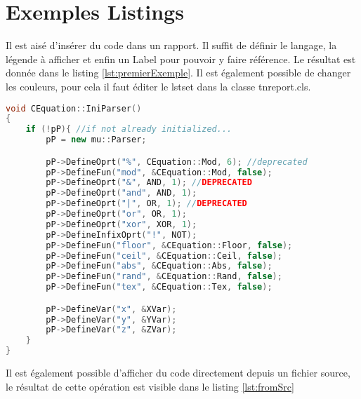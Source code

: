 \documentclass{tnreport}
\begin{document}
\cleardoublepage

\chapter{Exemples Listings}

Il est aisé d'insérer du code dans un rapport. Il suffit de définir le langage, la légende à afficher et enfin un Label pour pouvoir y faire référence. Le résultat est donnée dans le listing \ref{lst:premierExemple}. Il est également possible de changer les couleurs, pour cela il faut éditer le lstset dans la classe tnreport.cls.

\begin{lstlisting}[language=c++, caption={Premier Exemple}, label={lst:premierExemple}]
void CEquation::IniParser()
{
	if (!pP){ //if not already initialized...
		pP = new mu::Parser;

		pP->DefineOprt("%", CEquation::Mod, 6); //deprecated
		pP->DefineFun("mod", &CEquation::Mod, false);
		pP->DefineOprt("&", AND, 1); //DEPRECATED
		pP->DefineOprt("and", AND, 1);
		pP->DefineOprt("|", OR, 1); //DEPRECATED
		pP->DefineOprt("or", OR, 1);
		pP->DefineOprt("xor", XOR, 1);
		pP->DefineInfixOprt("!", NOT);
		pP->DefineFun("floor", &CEquation::Floor, false);
		pP->DefineFun("ceil", &CEquation::Ceil, false);
		pP->DefineFun("abs", &CEquation::Abs, false);
		pP->DefineFun("rand", &CEquation::Rand, false);
		pP->DefineFun("tex", &CEquation::Tex, false);

		pP->DefineVar("x", &XVar);
		pP->DefineVar("y", &YVar);
		pP->DefineVar("z", &ZVar);
	}
}
\end{lstlisting}
\clearpage
Il est également possible d'afficher du code directement depuis un fichier source, le résultat de cette opération est visible dans le listing \ref{lst:fromSrc}

\end{document}
